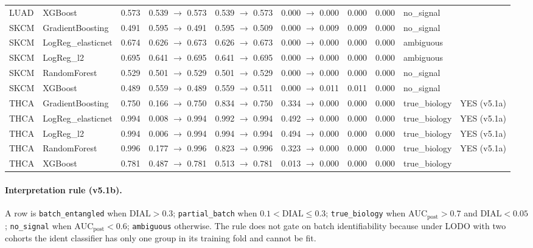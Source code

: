 \documentclass[11pt,a4paper]{article}
\begin{document}
\begin{tabular}{llrrrrrrll}
LUAD & XGBoost & 0.573 & 0.539 $\to$ 0.573 & 0.539 $\to$ 0.573 & 0.000 $\to$ 0.000 & 0.000 & 0.000 & no\_signal &  \\
SKCM & GradientBoosting & 0.491 & 0.595 $\to$ 0.491 & 0.595 $\to$ 0.509 & 0.000 $\to$ 0.009 & 0.009 & 0.000 & no\_signal &  \\
SKCM & LogReg\_elasticnet & 0.674 & 0.626 $\to$ 0.673 & 0.626 $\to$ 0.673 & 0.000 $\to$ 0.000 & 0.000 & 0.000 & ambiguous &  \\
SKCM & LogReg\_l2 & 0.695 & 0.641 $\to$ 0.695 & 0.641 $\to$ 0.695 & 0.000 $\to$ 0.000 & 0.000 & 0.000 & ambiguous &  \\
SKCM & RandomForest & 0.529 & 0.501 $\to$ 0.529 & 0.501 $\to$ 0.529 & 0.000 $\to$ 0.000 & 0.000 & 0.000 & no\_signal &  \\
SKCM & XGBoost & 0.489 & 0.559 $\to$ 0.489 & 0.559 $\to$ 0.511 & 0.000 $\to$ 0.011 & 0.011 & 0.000 & no\_signal &  \\
THCA & GradientBoosting & 0.750 & 0.166 $\to$ 0.750 & 0.834 $\to$ 0.750 & 0.334 $\to$ 0.000 & 0.000 & 0.000 & true\_biology & YES (v5.1a) \\
THCA & LogReg\_elasticnet & 0.994 & 0.008 $\to$ 0.994 & 0.992 $\to$ 0.994 & 0.492 $\to$ 0.000 & 0.000 & 0.000 & true\_biology & YES (v5.1a) \\
THCA & LogReg\_l2 & 0.994 & 0.006 $\to$ 0.994 & 0.994 $\to$ 0.994 & 0.494 $\to$ 0.000 & 0.000 & 0.000 & true\_biology & YES (v5.1a) \\
THCA & RandomForest & 0.996 & 0.177 $\to$ 0.996 & 0.823 $\to$ 0.996 & 0.323 $\to$ 0.000 & 0.000 & 0.000 & true\_biology & YES (v5.1a) \\
THCA & XGBoost & 0.781 & 0.487 $\to$ 0.781 & 0.513 $\to$ 0.781 & 0.013 $\to$ 0.000 & 0.000 & 0.000 & true\_biology &  \\
\bottomrule\end{tabular}

\paragraph{Interpretation rule (v5.1b).} A row is \texttt{batch\_entangled} when $\mathrm{DIAL} > 0.3$; \texttt{partial\_batch} when $0.1 < \mathrm{DIAL} \le 0.3$; \texttt{true\_biology} when $\mathrm{AUC}_{\mathrm{post}} > 0.7$ and $\mathrm{DIAL} < 0.05$; \texttt{no\_signal} when $\mathrm{AUC}_{\mathrm{post}} < 0.6$; \texttt{ambiguous} otherwise. The rule does not gate on batch identifiability because under LODO with two cohorts the ident classifier has only one group in its training fold and cannot be fit.
\end{document}
